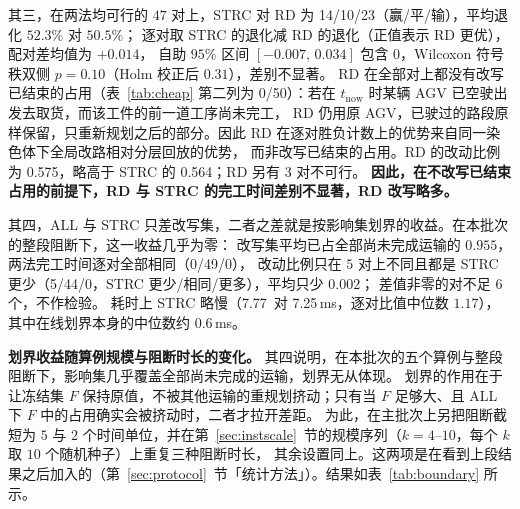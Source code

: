 \documentclass[manuscript,screen,review]{acmart}
\providecommand{\STRC}{\textsc{STRC}}
\newcommand{\NSeeds}{10}
\newcommand{\NPairs}{50}
\newcommand{\MsAllFuture}{7.25}      %
\newcommand{\MsCheapRtwo}{7.77}      %
\newcommand{\RedecodeBad}{0/\NPairs}
\newcommand{\WinVsRedecode}{14/10/23} %
\newcommand{\WinVsAllFuture}{0/49/0}  %
\newcommand{\ResFracCheapRtwo}{0.564}
\newcommand{\ResFracRedecode}{0.575}
\newcommand{\RAStabWTL}{5/44/0}      %
\begin{document}
其三，在两法均可行的 \(47\) 对上，\STRC{} 对 RD 为 \WinVsRedecode（赢/平/输），平均退化 \(52.3\%\) 对 \(50.5\%\)；
逐对取 \STRC{} 的退化减 RD 的退化（正值表示 RD 更优），配对差均值为 \(+0.014\)，
自助 \(95\%\) 区间 \([-0.007,\,0.034]\) 包含 \(0\)，Wilcoxon 符号秩双侧 \(p=0.10\)（Holm 校正后 \(0.31\)），差别不显著。
RD 在全部对上都没有改写已结束的占用（表~\ref{tab:cheap} 第二列为 \RedecodeBad）：若在 \(t_{\mathrm{now}}\) 时某辆 AGV 已空驶出发去取货，而该工件的前一道工序尚未完工，
RD 仍用原 AGV，已驶过的路段原样保留，只重新规划之后的部分。因此 RD 在逐对胜负计数上的优势来自同一染色体下全局改路相对分层回放的优势，
而非改写已结束的占用。RD 的改动比例为 \ResFracRedecode，略高于 \STRC{} 的 \ResFracCheapRtwo；RD 另有 \(3\) 对不可行。
\textbf{因此，在不改写已结束占用的前提下，RD 与 \STRC{} 的完工时间差别不显著，RD 改写略多。}

其四，ALL 与 \STRC{} 只差改写集，二者之差就是按影响集划界的收益。在本批次的整段阻断下，这一收益几乎为零：
改写集平均已占全部尚未完成运输的 \(0.955\)，两法完工时间逐对全部相同（\WinVsAllFuture），
改动比例只在 \(5\) 对上不同且都是 \STRC{} 更少（\RAStabWTL，\STRC{} 更少/相同/更多），平均只少 \(0.002\)；
差值非零的对不足 \(6\) 个，不作检验。
耗时上 \STRC{} 略慢（\MsCheapRtwo\ 对 \MsAllFuture\,ms，逐对比值中位数 \(1.17\)），其中在线划界本身的中位数约 \(0.6\)\,ms。

\textbf{划界收益随算例规模与阻断时长的变化。}
其四说明，在本批次的五个算例与整段阻断下，影响集几乎覆盖全部尚未完成的运输，划界无从体现。
划界的作用在于让冻结集 \(F\) 保持原值，不被其他运输的重规划挤动；只有当 \(F\) 足够大、且 ALL 下 \(F\) 中的占用确实会被挤动时，二者才拉开差距。
为此，在主批次上另把阻断截短为 \(5\) 与 \(2\) 个时间单位，并在第~\ref{sec:instscale}~节的规模序列（\(k=4\)--\(10\)，每个 \(k\) 取 \(\NSeeds\) 个随机种子）上重复三种阻断时长，
其余设置同上。这两项是在看到上段结果之后加入的（第~\ref{sec:protocol}~节「统计方法」）。结果如表~\ref{tab:boundary} 所示。
\end{document}
